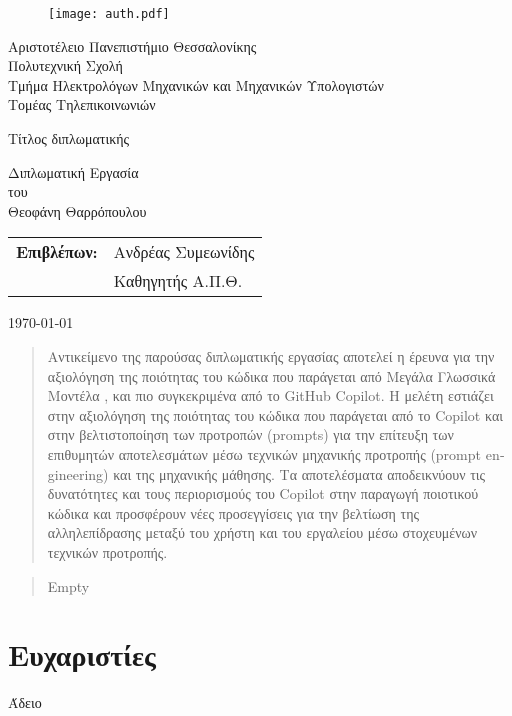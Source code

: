 \begin{titlepage}

\begin{figure}[H]
  \begin{center}
    \texttt{[image: auth.pdf]}
    \label{fig:cover_auth_logo}
  \end{center}
\end{figure}

\centering
\Large Αριστοτέλειο Πανεπιστήμιο Θεσσαλονίκης\\
\Large Πολυτεχνική Σχολή\\
\large Τμήμα Ηλεκτρολόγων Μηχανικών και Μηχανικών Υπολογιστών\\
\large Τομέας Τηλεπικοινωνιών

\vspace{\fill}

\LARGE Τίτλος διπλωματικής

\vspace{\fill}

\Large Διπλωματική Εργασία\\
\Large του\\
\Large Θεοφάνη Θαρρόπουλου

\vspace{\fill}
\raggedright

\begin{tabular}{ll}
\textbf{Επιβλέπων:} & Ανδρέας Συμεωνίδης \\
 & Καθηγητής Α.Π.Θ.\\
\end{tabular}

\centering
\vspace{\fill}
\today


\end{titlepage}

\begin{abstract}
Αντικείμενο της παρούσας διπλωματικής εργασίας αποτελεί η έρευνα για την αξιολόγηση της ποιότητας του κώδικα που παράγεται από Μεγάλα Γλωσσικά Μοντέλα , και πιο συγκεκριμένα από το \textlatin{GitHub Copilot}\cite{githubcopilot}. Η μελέτη εστιάζει στην αξιολόγηση της ποιότητας του κώδικα που παράγεται από το Copilot και στην βελτιστοποίηση των προτροπών \textlatin{(prompts)} για την επίτευξη των επιθυμητών αποτελεσμάτων μέσω τεχνικών μηχανικής προτροπής \textlatin{(prompt engineering)} και της μηχανικής μάθησης. Τα αποτελέσματα αποδεικνύουν τις δυνατότητες και τους περιορισμούς του Copilot στην παραγωγή ποιοτικού κώδικα και προσφέρουν νέες προσεγγίσεις για την βελτίωση της αλληλεπίδρασης μεταξύ του χρήστη και του εργαλείου μέσω στοχευμένων τεχνικών προτροπής.
\end{abstract}

\begin{abstract}
Empty
\end{abstract}

\thispagestyle{empty}


\section*{Ευχαριστίες}
\thispagestyle{empty}

Άδειο

\clearpage
